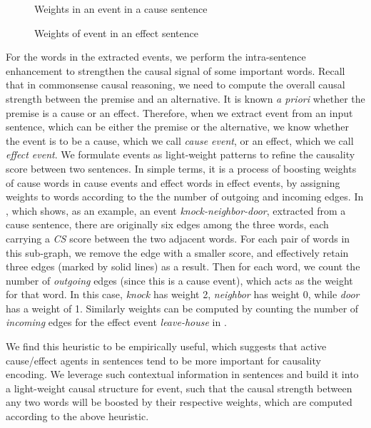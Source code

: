 {\begin{figure}[th]
\centering
{}
\caption{Weights in an event in a cause sentence}
\label{fig:causeEvent}
\end{figure}

\begin{figure}[th]
\centering
{}
\caption{Weights of event in an effect sentence}
\label{fig:effectEvent}
\end{figure}

For the words in the extracted events, we perform the intra-sentence
enhancement to strengthen the causal signal of some important words.
Recall that in commonsense causal reasoning, we need to compute the
overall causal strength between the premise and an alternative. It
is known {\em a priori} whether the premise is a cause or an effect.
Therefore, when we extract event from an input sentence, which can
be either the premise or the alternative, we know whether the event
is to be a cause, which we call {\em cause event}, or an effect,
which we call {\em effect event}. We formulate events as
light-weight patterns to refine the causality score between two
sentences. In simple terms, it is a process of boosting weights of
cause words in cause events and effect words in effect events, by
assigning weights to words according to the the number of outgoing
and incoming edges. In , which shows, as
an example, an event {\em knock-neighbor-door},
extracted from a cause sentence, there are
originally six edges among the three words, each carrying a \emph{CS}
score between the two adjacent words. For each pair of words in this
sub-graph, we remove the edge with a smaller score, and effectively
retain three edges (marked by solid lines) as a result. Then for
each word, we count the number of {\em outgoing} edges (since this
is a cause event), which acts as the weight for that word. In this
case, {\em knock} has weight 2, {\em neighbor} has weight 0, while
{\em door} has a weight of 1. Similarly weights can be computed by
counting the number of {\em incoming} edges for the effect event
{\em leave-house} in .

We find this heuristic to be empirically useful, which
suggests that active cause/effect agents in sentences tend to be
more important for causality encoding. We leverage such contextual
information in sentences and build it into a light-weight causal
structure for event, such that the causal strength between any two
words will be boosted by their respective weights, which are computed
according to the above heuristic.

}%


